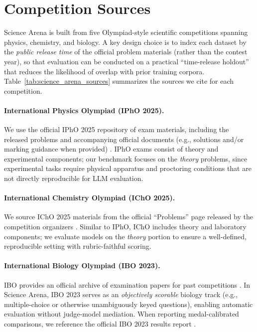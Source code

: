 \documentclass[11pt]{article}
\begin{document}



\appendix
\section{Competition Sources}
\label{app:competitions}

Science Arena is built from five Olympiad-style scientific competitions spanning physics, chemistry, and biology. A key design choice is to index each dataset by the \emph{public release time} of the official problem materials (rather than the contest year), so that evaluation can be conducted on a practical ``time-release holdout'' that reduces the likelihood of overlap with prior training corpora. Table~\ref{tab:science_arena_sources} summarizes the sources we cite for each competition.

\paragraph{International Physics Olympiad (IPhO 2025).}
We use the official IPhO 2025 repository of exam materials, including the released problems and accompanying official documents (e.g., solutions and/or marking guidance when provided) \citep{ipho2025_official_questions}. IPhO exams consist of theory and experimental components; our benchmark focuses on the \emph{theory} problems, since experimental tasks require physical apparatus and proctoring conditions that are not directly reproducible for LLM evaluation.

\paragraph{International Chemistry Olympiad (IChO 2025).}
We source IChO 2025 materials from the official ``Problems'' page released by the competition organizers \citep{icho2025_problems_page}. Similar to IPhO, IChO includes theory and laboratory components; we evaluate models on the \emph{theory} portion to ensure a well-defined, reproducible setting with rubric-faithful scoring.

\paragraph{International Biology Olympiad (IBO 2023).}
IBO provides an official archive of examination papers for past competitions \citep{ibo_papers_archive}. In Science Arena, IBO 2023 serves as an \emph{objectively scorable} biology track (e.g., multiple-choice or otherwise unambiguously keyed questions), enabling automatic evaluation without judge-model mediation. When reporting medal-calibrated comparisons, we reference the official IBO 2023 results report \citep{ibo2023_final_results}.
\end{document}
